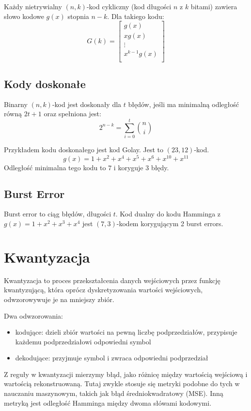 \documentclass{../notatki}
\begin{document}
Każdy nietrywialny $(n, k)$-kod cykliczny (kod długości $n$ z $k$ bitami)
zawiera słowo kodowe $g(x)$ stopnia $n - k$. Dla takiego kodu:
$$
G(k) =
\begin{bmatrix}
g(x) \\
xg(x) \\
\vdots \\
x^{k - 1}g(x) \\
\end{bmatrix}
$$

\subsection{Kody doskonałe}

Binarny $(n, k)$-kod jest doskonały dla $t$ błędów, jeśli ma minimalną odległość
równą $2t + 1$ oraz spełniona jest:
$$
2^{n - k} = \sum_{i = 0}^{t} \binom{n}{i}
$$

Przykładem kodu doskonałego jest kod Golay. Jest to $(23, 12)$-kod.
$$
g(x) = 1 + x^2 + x^4 + x^5 + x^6 + x^10 + x^11
$$
Odległość minimalna tego kodu to $7$ i koryguje $3$ błędy.

\subsection{Burst Error}

Burst error to ciąg błędów, długości $t$. Kod dualny do kodu Hamminga z
$g(x)=1 + x^2 + x^3 + x^4$ jest $(7,3)$-kodem korygującym 2 burst errors.

\section{Kwantyzacja}

Kwantyzacja to proces przekształcenia danych wejściowych przez
funkcję kwantyzującą,
która oprócz dyskretyzowania wartości wejściowych, odwzorowywuje je na mniejszy
zbiór.

\noindent
Dwa odwzorowania:
\begin{itemize}
\item kodujące: dzieli zbiór wartości na pewną liczbę podprzedziałów,
przypisuje każdemu podprzedziałowi
odpowiedni symbol
\item dekodujące: przyjmuje symbol i zwraca odpowiedni podprzedział
\end{itemize}

Z reguły w kwantyzacji mierzymy błąd, jako różnicę między wartością wejściową
i wartością rekonstruowaną. Tutaj zwykle stosuje się metryki podobne do tych
w nauczaniu maszynowym, takich jak błąd średniokwadratowy (MSE). Inną metryką
jest odległość Hamminga między dwoma słówami kodowymi.
\end{document}
